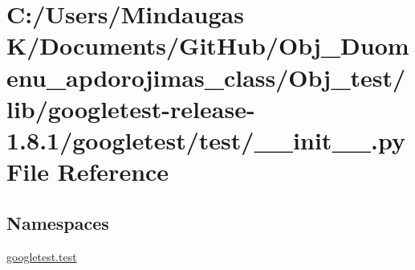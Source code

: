 \hypertarget{_obj__test_2lib_2googletest-release-1_88_81_2googletest_2test_2____init_____8py}{}\section{C\+:/\+Users/\+Mindaugas K/\+Documents/\+Git\+Hub/\+Obj\+\_\+\+Duomenu\+\_\+apdorojimas\+\_\+class/\+Obj\+\_\+test/lib/googletest-\/release-\/1.8.1/googletest/test/\+\_\+\+\_\+init\+\_\+\+\_\+.py File Reference}
\label{_obj__test_2lib_2googletest-release-1_88_81_2googletest_2test_2____init_____8py}
\subsection*{Namespaces}
\begin{DoxyCompactItemize}
\item 
 \mbox{\hyperlink{namespacegoogletest_1_1test}{googletest.\+test}}
\end{DoxyCompactItemize}
